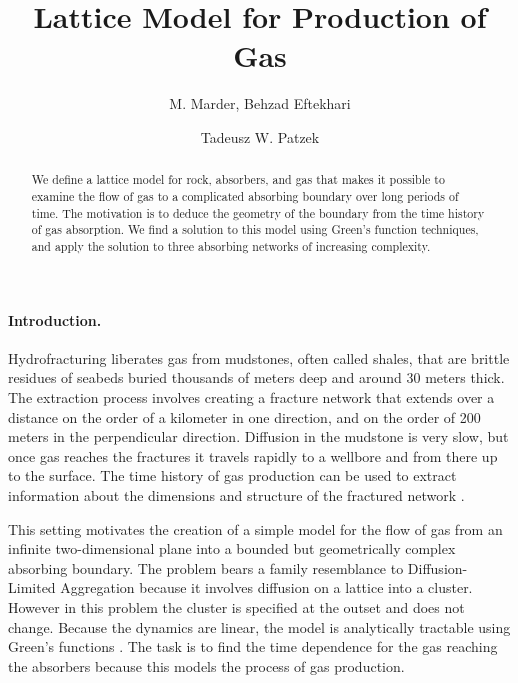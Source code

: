 \documentclass[english,notitlepage,twocolumn]{revtex4-1}
\begin{document}
\title{Lattice Model for Production of Gas}

\author{M. Marder, Behzad Eftekhari}
\author{Tadeusz W. Patzek}
\begin{abstract}
We define a lattice model for rock, absorbers, and gas that makes
it possible to examine the flow of gas to a complicated absorbing
boundary over long periods of time. The motivation is to deduce the
geometry of the boundary from the time history of gas absorption.
We find a solution to this model using Green's function techniques,
and apply the solution to three absorbing networks of increasing complexity. 
\end{abstract}
\maketitle

\paragraph{Introduction.}

Hydrofracturing \cite{Turcotte.14,Marder2016} liberates gas from
mudstones, often called shales, that are brittle residues of seabeds
buried thousands of meters deep and around 30 meters thick. The extraction
process involves creating a fracture network that extends over a distance
on the order of a kilometer in one direction, and on the order of
200 meters in the perpendicular direction. Diffusion in the mudstone
is very slow, but once gas reaches the fractures it travels rapidly
to a wellbore and from there up to the surface. The time history of
gas production can be used to extract information about the dimensions
and structure of the fractured network \cite{Patzek.13,Patzek.14}.

This setting motivates the creation of a simple model for the flow
of gas from an infinite two-dimensional plane into a bounded but geometrically
complex absorbing boundary. The problem bears a family resemblance
to Diffusion-Limited Aggregation
\cite{witten1981diffusion,Sahimi1993,Halsey2000
}
because it involves diffusion on a lattice into a cluster. However
in this problem the cluster is specified at the outset and does not
change. Because the dynamics are linear, the model is analytically
tractable using Green's functions \cite{Economou.83,Berciu.10,Joyce2017}.
The task is to find the time dependence for the gas reaching the absorbers
because this models the process of gas production.
\end{document}
